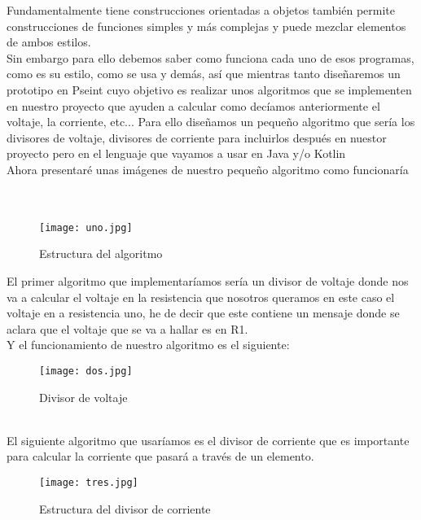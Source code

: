 \documentclass[journal]{IEEEtran}
\begin{document}
Fundamentalmente tiene construcciones orientadas a objetos también permite construcciones de funciones simples y más complejas y puede mezclar elementos de ambos estilos.\\

Sin embargo para ello debemos saber como funciona cada uno de esos programas, como es su estilo, como se usa y demás, así que mientras tanto diseñaremos un prototipo en Pseint cuyo objetivo es realizar unos algoritmos que se implementen en nuestro proyecto que ayuden a calcular como decíamos anteriormente el voltaje, la corriente, etc... Para ello diseñamos un pequeño algoritmo que sería los divisores de voltaje, divisores de corriente para incluirlos después en nuestor proyecto pero en el lenguaje que vayamos a usar en Java y/o Kotlin\\ 
Ahora presentaré unas imágenes de nuestro pequeño algoritmo como funcionaría\\
\
\\
\\
\begin{figure}[h!]
\texttt{[image: uno.jpg]}%
\caption{Estructura del algoritmo}
\label{Figura: c}
\end{figure}


El primer algoritmo que implementaríamos sería un divisor de voltaje donde nos va a calcular el voltaje en la resistencia que nosotros queramos en este caso el voltaje en a resistencia uno, he de decir que este contiene un mensaje donde se aclara que el voltaje que se va a hallar es en R1.\\
 Y el funcionamiento de nuestro algoritmo es el siguiente:\\
\begin{figure}[h!]
\texttt{[image: dos.jpg]}%
\caption{Divisor de voltaje}
\label{Figura: c}
\end{figure}
\
\\
El siguiente algoritmo que usaríamos es el divisor de corriente que es importante para calcular la corriente que pasará a través de un elemento.\\
\begin{figure}[h!]
\texttt{[image: tres.jpg]}%
\caption{Estructura del divisor de corriente}
\label{Figura: c}
\end{figure}\\
\end{document}
